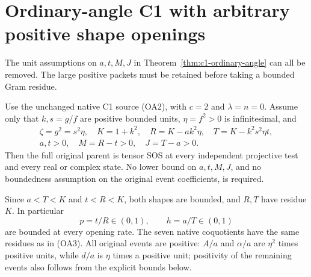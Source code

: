 \section{Ordinary-angle C1 with arbitrary positive shape openings}
\label{sec:c1-arbitrary-openings}

The unit assumptions on $a,t,M,J$ in
Theorem~\ref{thm:c1-ordinary-angle} can all be removed. The large
positive packets must be retained before taking a bounded Gram residue.

\begin{theorem}
Use the unchanged native C1 source (OA2), with $c=2$ and
$\lambda=n=0$. Assume only that $k,s=g/f$ are positive bounded units,
$\eta=f^2>0$ is infinitesimal, and
\[
\begin{gathered}
 \zeta=g^2=s^2\eta,\quad K=1+k^2,\quad
 R=K-ak^2\eta,\quad T=K-k^2s^2\eta t,\\
 a,t>0,\quad M=R-t>0,\quad J=T-a>0.
\end{gathered}\tag{AO1}
\]
Then the full original parent is tensor SOS at every independent
projective test and every real or complex state. No lower bound on
$a,t,M,J$, and no boundedness assumption on the original event
coefficients, is required.
\end{theorem}

Since $a<T<K$ and $t<R<K$, both shapes are bounded, and $R,T$ have
residue $K$. In particular
\[
       p=t/R\in(0,1),\qquad h=a/T\in(0,1)              \tag{AO2}
\]
are bounded at every opening rate. The seven native coquotients have
the same residues as in (OA3). All original events are positive:
$A/a$ and $\alpha/a$ are $\eta^2$ times positive units, while
$d/a$ is $\eta$ times a positive unit; positivity of the remaining
events also follows from the explicit bounds below.

